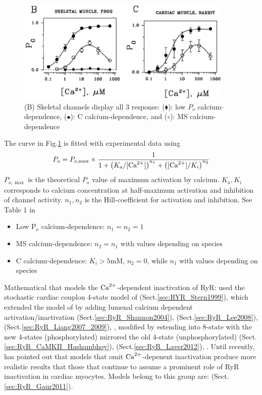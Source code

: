 \begin{figure}[hbt]
  \centerline{\includegraphics[height=5cm,
    angle=0]{./images/RyR_Po_modes.eps}}
\caption{(B) Skeletal channels display all 3 response: ($\blacklozenge$):
low $P_o$ calcium-dependence, ($\bullet$): C calcium-dependence, and ($\circ$):
MS calcium-dependence \citep{marengo1998}}
\label{fig:RyR_Po_mode}
\end{figure}

The curve in Fig.\ref{fig:RyR_Po_mode} is fitted with experimental data using
\begin{equation}
P_o = P_{o,\max} \times \frac{1}{1 + \left( K_a/[{\text{Ca}^{2+}}] \right)^{n_1} + \left(
[{\text{Ca}^{2+}}]/K_i \right)^{n_2} }
\end{equation} 
$P_{o,\max}$ is the theoretical $P_o$ value of maximum activation by calcium.
$K_a, K_i$ corresponds to calcium concentration at half-maximum activation and
inhibition of channel activity. $n_1,n_2$ is the Hill-coefficient for activation
and inhibition. See Table 1 in \citep{marengo1998} 
\begin{itemize}
  \item Low P$_o$ calcium-dependence: $n_1=n_2=1$
  \item MS calcium-dependence: $n_2=n_1$ with values depending on species
  \item C calcium-dependence: $K_i>5$mM, $n_2=0$, while $n_1$ with values
  depending on species
\end{itemize}

Mathematical that models the ${\text{Ca}^{2+}}$-dependent inactivation of RyR:
\citep{wang2004, rovetti2010sis} used the stochastic cardiac couplon 4-state
model of \citep{stern1999lcm} (Sect.\ref{sec:RYR_Stern1999}),
\citep{shannon2004} which extended the model of \citep{stern1999lcm} by adding
lumenal calcium dependent activation/inactivation
(Sect.\ref{sec:RyR_Shannon2004}), \citep{Lee2008} (Sect.\ref{sec:RyR_Lee2008}),
\citep{Liang2007} (Sect.\ref{sec:RyR_Liang2007_2009}), \citep{Krishna2010} ,
\citep{Hashambhoy2010} modified \citep{shannon2004} by estending into 8-state
with the new 4-states (phosphorylated) mirrored the old 4-state
(unphosphorylated) (Sect.\ref{sec:RyR_CaMKII_Hashambhoy}), \citep{laver2012}
(Sect.\ref{sec:RyR_Laver2012}), \citep{Cannell2013}.
Until recently, \citep{Liu2013} has pointed out that models that omit ${\text{Ca}^{2+}}$-depenent
inactivation produce more realistic results that those that continue to assume a
prominent role of RyR inactivation in cardiac myocytes. Models belong to this
group are: \citep{Gaur2011} (Sect.\ref{sec:RyR_Gaur2011}).
 
